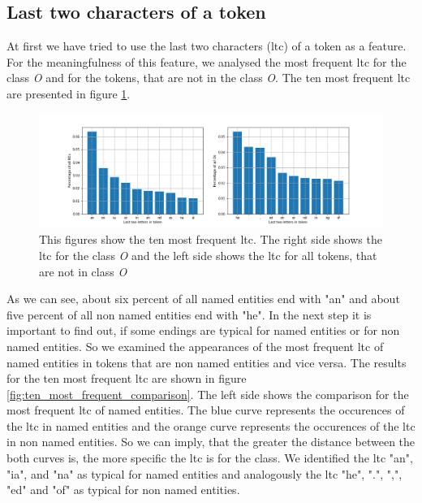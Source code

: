 \documentclass[noindent, nochapname]{tudexercise}
\begin{document}
		\subsection{Last two characters of a token}
			At first we have tried to use the last two characters (ltc) of a token as a feature. For the meaningfulness of this feature, we analysed the most frequent ltc for the class \textit{O} and for the tokens, that are not in the class \textit{O}. The ten most frequent ltc are presented in figure \ref{fig:ten_most_frequent_ltc}.
			
			\begin{figure}[h]
				\centering
				\includegraphics[scale=0.5]{img/last_two_letters_per_class.png}
				\caption{This figures show the ten most frequent ltc. The right side shows the ltc for the class \textit{O} and the left side shows the ltc for all tokens, that are not in class \textit{O}}
				\label{fig:ten_most_frequent_ltc}
			\end{figure}
			
			As we can see, about six percent of all named entities end with "an" and about five percent of all non named entities end with "he". In the next step it is important to find out, if some endings are typical for named entities or for non named entities. So we examined the appearances of the most frequent ltc of named entities in tokens that are non named entities and vice versa. The results for the ten most frequent ltc are shown in figure \ref{fig:ten_most_frequent_comparison}. The left side shows the comparison for the most frequent ltc of named entities. The blue curve represents the occurences of the ltc in named entities and the orange curve represents the occurences of the ltc in non named entities. So we can imply, that the greater the distance between the both curves is, the more specific the ltc is for the class. We identified the ltc "an", "ia", and "na" as typical for named entities and analogously the ltc "he", ".", ",", "ed" and "of" as typical for non named entities.\\
			
\end{document}
